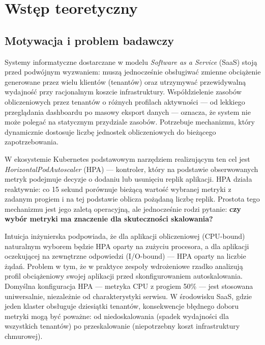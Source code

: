 \chapter{Wstęp teoretyczny}

\section{Motywacja i problem badawczy}

Systemy informatyczne dostarczane w modelu \textit{Software as a Service} (SaaS) stoją przed podwójnym wyzwaniem: muszą jednocześnie obsługiwać zmienne obciążenie generowane przez wielu klientów (tenantów) oraz utrzymywać przewidywalną wydajność przy racjonalnym koszcie infrastruktury. Współdzielenie zasobów obliczeniowych przez tenantów o różnych profilach aktywności --- od lekkiego przeglądania dashboardu po masowy eksport danych --- oznacza, że system nie może polegać na statycznym przydziale zasobów. Potrzebuje mechanizmu, który dynamicznie dostosuje liczbę jednostek obliczeniowych do bieżącego zapotrzebowania.

W ekosystemie Kubernetes podstawowym narzędziem realizującym ten cel jest \textit{HorizontalPodAutoscaler} (HPA) --- kontroler, który na podstawie obserwowanych metryk podejmuje decyzje o dodaniu lub usunięciu replik aplikacji. HPA działa reaktywnie: co 15 sekund porównuje bieżącą wartość wybranej metryki z zadanym progiem i na tej podstawie oblicza pożądaną liczbę replik. Prostota tego mechanizmu jest jego zaletą operacyjną, ale jednocześnie rodzi pytanie: \textbf{czy wybór metryki ma znaczenie dla skuteczności skalowania?}

Intuicja inżynierska podpowiada, że dla aplikacji obliczeniowej (CPU-bound) naturalnym wyborem będzie HPA oparty na zużyciu procesora, a dla aplikacji oczekującej na zewnętrzne odpowiedzi (I/O-bound) --- HPA oparty na liczbie żądań. Problem w tym, że w praktyce zespoły wdrożeniowe rzadko analizują profil obciążeniowy swojej aplikacji przed skonfigurowaniem autoskalowania. Domyślna konfiguracja HPA --- metryka CPU z progiem 50\% --- jest stosowana uniwersalnie, niezależnie od charakterystyki serwisu. W środowisku SaaS, gdzie jeden klaster obsługuje dziesiątki tenantów, konsekwencje błędnego doboru metryki mogą być poważne: od niedoskalowania (spadek wydajności dla wszystkich tenantów) po przeskalowanie (niepotrzebny koszt infrastruktury chmurowej).

